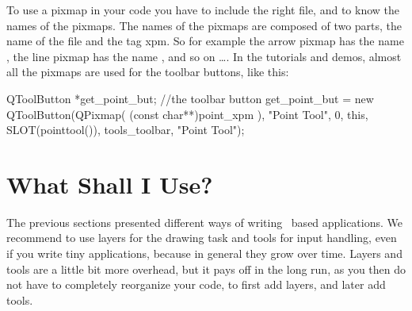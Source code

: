












To use a pixmap in your code you have to include the right file, and
to know the names of the pixmaps. The names of the pixmaps are
composed of two parts, the name of the file and the tag xpm. So for
example the arrow pixmap has the name , the line
pixmap has the name , and so on \ldots.  In the
tutorials and demos, almost all the pixmaps are used for the toolbar
buttons, like this:

\ccExample
\begin{ccExampleCode}
    QToolButton *get_point_but; //the toolbar button
    get_point_but =  new QToolButton(QPixmap( (const char**)point_xpm ),
                                     "Point Tool", 
                                     0, 
                                     this, 
                                     SLOT(pointtool()), 
                                     tools_toolbar, 
                                     "Point Tool");
\end{ccExampleCode}



\section{What Shall I Use?}

The previous sections presented different ways of writing \qt\ based 
applications. We recommend to use layers for the drawing task and tools
for input handling, even if you write tiny applications, because in general
they grow over time.   Layers and tools are a little bit more overhead, but 
it pays off in the long run, as you then do not have to completely
reorganize your code, to first add layers, and later add tools. 



